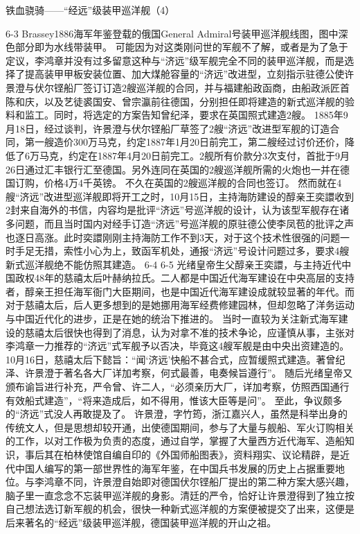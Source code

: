 \documentclass[12pt,UTF8]{ctexbook}
\begin{document}
铁血骁骑——“经远”级装甲巡洋舰（4）

6-3
Brassey1886海军年鉴登载的俄国General Admiral号装甲巡洋舰线图，图中深色部分即为水线带装甲。
可能因为对这类刚问世的军舰不了解，或者是为了急于定议，李鸿章并没有过多留意这种与“济远”级军舰完全不同的装甲巡洋舰，而是选择了提高装甲甲板安装位置、加大煤舱容量的“济远”改进型，立刻指示驻德公使许景澄与伏尔铿船厂签订订造2艘巡洋舰的合同，并与福建船政函商，由船政派匠首陈和庆，以及艺徒裘国安、曾宗瀛前往德国，分别担任即将建造的新式巡洋舰的验料和监工。同时，将选定的方案告知曾纪泽，要求在英国照式建造2艘。 1885年9月18日，经过谈判，许景澄与伏尔铿船厂草签了2艘“济远”改进型军舰的订造合同，第一艘造价300万马克，约定1887年1月20日前完工，第二艘经过讨价还价，降低了6万马克，约定在1887年4月20日前完工。2舰所有价款分3次支付，首批于9月26日通过汇丰银行汇至德国。另外连同在英国的2艘巡洋舰所需的火炮也一并在德国订购，价格4万4千英镑。 不久在英国的2艘巡洋舰的合同也签订。
然而就在4艘“济远”改进型巡洋舰即将开工之时，10月15日，主持海防建设的醇亲王奕譞收到2封来自海外的书信，内容均是批评“济远”号巡洋舰的设计，认为该型军舰存在诸多问题，而且当时国内对经手订造“济远”号巡洋舰的原驻德公使李凤苞的批评之声也逐日高涨。此时奕譞刚刚主持海防工作不到3天，对于这个技术性很强的问题一时手足无措，索性小心为上，致函军机处，通报“济远”号设计问题过多，要求4艘新式巡洋舰绝不能仿照其建造。
6-4 6-5
光绪皇帝生父醇亲王奕譞，与主持近代中国政权48年的慈禧太后叶赫纳拉氏。二人都是中国近代海军建设在中央高层的支持者，醇亲王担任海军衙门大臣期间，也是中国近代海军建设成就较显著的年代。而对于慈禧太后，后人更多想到的是她挪用海军经费修建园林，但却忽略了洋务运动与中国近代化的进步，正是在她的统治下推进的。
当时一直较为关注新式海军建设的慈禧太后很快也得到了消息，认为对拿不准的技术争论，应谨慎从事，主张对李鸿章一力推荐的“济远”式军舰予以否决，毕竟这4艘军舰是由中央出资建造的。10月16日，慈禧太后下懿旨：“闻‘济远’快船不甚合式，应暂缓照式建造。著曾纪泽、许景澄于著名各大厂详加考察，何式最善，电奏候旨遵行”。 随后光绪皇帝又颁布谕旨进行补充，严令曾、许二人，“必须亲历大厂，详加考察，仿照西国通行有效船式建造”，“将来造成后，如不得用，惟该大臣等是问”。 至此，争议颇多的“济远”式没人再敢提及了。
许景澄，字竹筠，浙江嘉兴人，虽然是科举出身的传统文人，但是思想却较开通，出使德国期间，参与了大量与舰船、军火订购相关的工作，以对工作极为负责的态度，通过自学，掌握了大量西方近代海军、造船知识，事后其在柏林使馆自编自印的《外国师船图表》，资料翔实、议论精辟，是近代中国人编写的第一部世界性的海军年鉴，在中国兵书发展的历史上占据重要地位。与李鸿章不同，许景澄自始即对德国伏尔铿船厂提出的第二种方案大感兴趣，脑子里一直念念不忘装甲巡洋舰的身影。清廷的严令，恰好让许景澄得到了独立按自己想法选订新军舰的机会，很快一种新式巡洋舰的方案便被提交了出来，这便是后来著名的“经远”级装甲巡洋舰，德国装甲巡洋舰的开山之祖。
\end{document}
